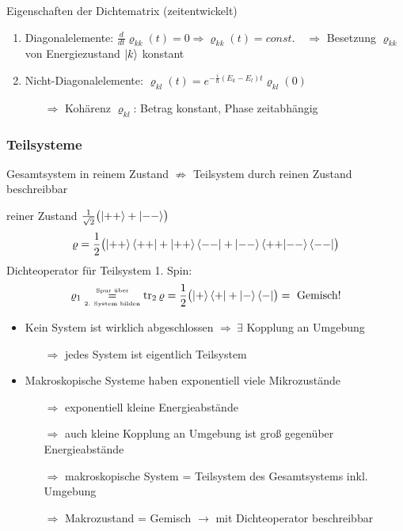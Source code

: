 \begin{prop}{Eigenschaften der Dichtematrix (zeitentwickelt)}
  \begin{enumerate}
    \item Diagonalelemente: $\frac{d}{dt} \varrho_{kk}(t) = 0 \Rightarrow \varrho_{kk}(t) = const. \quad \Rightarrow$  Besetzung $\varrho_{kk}$ von Energiezustand $\ket{k}$ konstant
    \item Nicht-Diagonalelemente: $\varrho_{kl}(t) = e^{- \frac{i}{\hbar}(E_k - E_l) t} \varrho_{kl}(0)$
    \begin{itemize}
        \item[$\Rightarrow$] Kohärenz $\varrho_{kl}$: Betrag konstant, Phase zeitabhängig
    \end{itemize}
\end{enumerate}  
\end{prop}


\subsubsection{Teilsysteme}
Gesamtsystem in reinem Zustand $\not\Longrightarrow$ Teilsystem durch reinen Zustand beschreibbar

\begin{beispiel}{reiner Zustand $\frac{1}{\sqrt{2}} \bigl(\ket{+ +} + \ket{- -} \bigr)$}
    \begin{equation*}
        \varrho = \frac{1}{2} \bigl( \ket{++}\bra{++} + \ket{++}\bra{--} +\ket{--}\bra{++} \ket{--}\bra{--}\bigr)    
        \end{equation*}
    Dichteoperator für Teilsystem 1. Spin: 
    \begin{equation*}
        \varrho_1 \overset{\text{\tiny{Spur über}}}{\underset{\text{\tiny{2. System bilden}}}{=}} \trace_2\varrho = \frac{1}{2}\bigl( \ket{+}\bra{+}+ \ket{-}\bra{-}\bigr) = \text{ Gemisch!}
    \end{equation*}
\end{beispiel}

\begin{itemize}
    \item Kein System ist wirklich abgeschlossen $\Rightarrow \ \exists$ Kopplung an Umgebung
    \begin{itemize}
         \item[$\Rightarrow$]jedes System ist eigentlich Teilsystem
    \end{itemize}
    \item Makroskopische Systeme haben exponentiell viele Mikrozustände
    \begin{itemize}
    \item[$\Rightarrow$] exponentiell kleine Energieabstände
    \item[$\Rightarrow$] auch kleine Kopplung an Umgebung ist groß gegenüber Energieabstände
    \item[$\Rightarrow$] makroskopische System = Teilsystem des Gesamtsystems inkl. Umgebung
    \item[$\Rightarrow$] Makrozustand = Gemisch $\rightarrow$ mit Dichteoperator beschreibbar
    \end{itemize}
\end{itemize}


